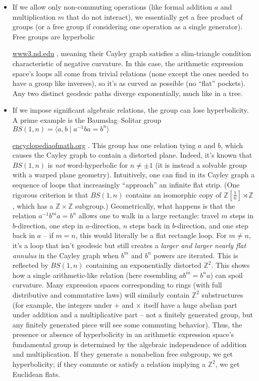 \documentclass[11pt]{article}
\theoremstyle{remark}
\begin{document}
\begin{itemize}
\item If we allow only non-commuting operations (like formal addition $a$ and multiplication $m$ that do not interact), we essentially get a free product of groups (or a free group if considering one operation as a single generator). Free groups are hyperbolic

\href{https://www3.nd.edu/~gszekely/rtg/GTS/www3.nd.edu/_jquigle2/GSTS%20FA18/Week3.pdf#:~:text=Definition%204,2}{www3.nd.edu}
, meaning their Cayley graph satisfies a slim-triangle condition characteristic of negative curvature. In this case, the arithmetic expression space’s loops all come from trivial relations (none except the ones needed to have a group like inverses), so it’s as curved as possible (no “flat” pockets). Any two distinct geodesic paths diverge exponentially, much like in a tree.


\item If we impose significant algebraic relations, the group can lose hyperbolicity. A prime example is the Baumslag–Solitar group $BS(1,n)=\langle a,b \mid a^{-1} b a = b^n \rangle$

\href{https://encyclopediaofmath.org/wiki/Baumslag-Solitar_group#:~:text=non,group%20defined%20by%20the%20presentation}{encyclopediaofmath.org}
. This group has one relation tying $a$ and $b$, which causes the Cayley graph to contain a distorted plane. Indeed, it’s known that $BS(1,n)$ is \textit{not} word-hyperbolic for $n\neq \pm1$ (it is instead a solvable group with a warped plane geometry). Intuitively, one can find in its Cayley graph a sequence of loops that increasingly “approach” an infinite flat strip. (One rigorous criterion is that $BS(1,n)$ contains an isomorphic copy of $\mathbb{Z}[\frac{1}{n}] \rtimes \mathbb{Z}$, which has a $\mathbb{Z}\times\mathbb{Z}$ subgroup.) Geometrically, what happens is that the relation $a^{-1} b^m a = b^n$ allows one to walk in a large rectangle: travel $m$ steps in $b$-direction, one step in $a$-direction, $n$ steps back in $b$-direction, and one step back in $a$ – if $m=n$, this would literally be a flat rectangle loop. For $m\neq n$, it’s a loop that isn’t geodesic but still creates a \textit{larger and larger nearly flat annulus} in the Cayley graph when $b^m$ and $b^n$ powers are iterated. This is reflected by $BS(1,n)$ containing an exponentially distorted $\mathbb{Z}^2$. This shows how a single arithmetic-like relation (here resembling $a b^m = b^n a$) can spoil curvature. Many expression spaces corresponding to rings (with full distributive and commutative laws) will similarly contain $\mathbb{Z}^2$ substructures (for example, the integers under $+$ and $\times$ itself have a huge abelian part under addition and a multiplicative part – not a finitely generated group, but any finitely generated piece will see some commuting behavior). Thus, the presence or absence of hyperbolicity in an arithmetic expression space’s fundamental group is determined by the algebraic independence of addition and multiplication. If they generate a nonabelian free subgroup, we get hyperbolicity; if they commute or satisfy a relation implying a $\mathbb{Z}^2$, we get Euclidean flats.


\end{itemize}
\end{document}
